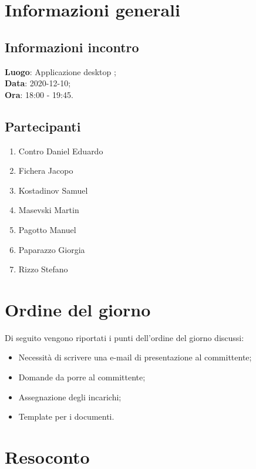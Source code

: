 \documentclass{article}
\begin{document}


\section{Informazioni generali}%
\label{sec:informazioni_generali}

\subsection{Informazioni incontro}%
\label{sub:informazioni_incontro}

\textbf{Luogo}: Applicazione desktop ; \\
\textbf{Data}: 2020-12-10; \\
\textbf{Ora}: 18:00 - 19:45.  

\subsection{Partecipanti}%
\label{sub:partecipanti}

\begin{enumerate}
    \item Contro Daniel Eduardo
    \item Fichera Jacopo
    \item Kostadinov Samuel
    \item Masevski Martin
    \item Pagotto Manuel
    \item Paparazzo Giorgia
    \item Rizzo Stefano
\end{enumerate}

\section{Ordine del giorno}%
\label{sec:ordine_del_giorno}

Di seguito vengono riportati i punti dell'ordine del giorno discussi:
\begin{itemize}
    \item Necessità di scrivere una e-mail di presentazione al committente;
    \item Domande da porre al committente;
    \item Assegnazione degli incarichi;
    \item Template per i documenti.
\end{itemize}

\section{Resoconto}%
\label{sec:resoconto}
\end{document}
